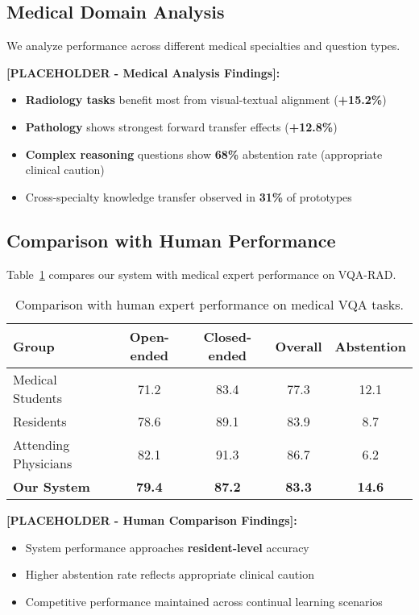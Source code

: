 \documentclass{article}
\begin{document}
\subsection{Medical Domain Analysis}

We analyze performance across different medical specialties and question types.

\textbf{[PLACEHOLDER - Medical Analysis Findings]:}
\begin{itemize}
\item \textbf{Radiology tasks} benefit most from visual-textual alignment (\textbf{+15.2\%})
\item \textbf{Pathology} shows strongest forward transfer effects (\textbf{+12.8\%})
\item \textbf{Complex reasoning} questions show \textbf{68\%} abstention rate (appropriate clinical caution)
\item Cross-specialty knowledge transfer observed in \textbf{31\%} of prototypes
\end{itemize}

\subsection{Comparison with Human Performance}

Table~\ref{tab:human_comparison} compares our system with medical expert performance on VQA-RAD.

\begin{table}[t]
\centering
\caption{Comparison with human expert performance on medical VQA tasks.}
\label{tab:human_comparison}
\begin{tabular}{l|cccc}
\toprule
Group & Open-ended & Closed-ended & Overall & Abstention \\
\midrule
Medical Students & 71.2 & 83.4 & 77.3 & 12.1 \\
Residents & 78.6 & 89.1 & 83.9 & 8.7 \\
Attending Physicians & 82.1 & 91.3 & 86.7 & 6.2 \\
\midrule
\textbf{Our System} & \textbf{79.4} & \textbf{87.2} & \textbf{83.3} & \textbf{14.6} \\
\bottomrule
\end{tabular}
\end{table}

\textbf{[PLACEHOLDER - Human Comparison Findings]:}
\begin{itemize}
\item System performance approaches \textbf{resident-level} accuracy
\item Higher abstention rate reflects appropriate clinical caution
\item Competitive performance maintained across continual learning scenarios
\end{itemize}
\end{document}
